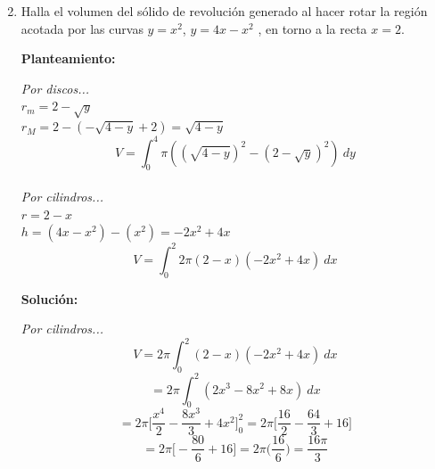 \documentclass[10pt,letterpaper]{article}
\begin{document}
\begin{enumerate}
\begin{multicols}{2}
\end{multicols}


\item Halla el volumen del sólido de revolución generado al hacer rotar la región acotada por las
      curvas $y = x^2$, $y = 4x - x^2$ , en torno a la recta $x = 2$.

\begin{multicols}{2}


\textbf{Planteamiento:}

\textit{Por discos...} \\
$r_m = 2-\sqrt{y}$ \\
$r_M = 2-(-\sqrt{4-y} + 2) = \sqrt{4-y}$
$$V = \int_{0}^{4} \pi ( (\sqrt{4-y})^2 - (2-\sqrt{y})^2 ) \ dy$$ \\

\textit{Por cilindros...} \\
$r = 2-x$ \\
$h = (4x-x^2)-(x^2) = -2x^2 + 4x$
$$V = \int_{0}^{2} 2\pi (2-x)(-2x^2+4x)\ dx$$

\textbf{Solución:}

\textit{Por cilindros...}
$$V = 2\pi \int_{0}^{2} (2-x)(-2x^2+4x)\ dx$$
$$= 2\pi \int_{0}^{2} (2x^3 - 8x^2 + 8x)\ dx$$
$$= 2\pi \bigg[ \frac{x^4}{2} - \frac{8x^3}{3} + 4x^2 \bigg]_{0}^{2}
= 2\pi \bigg[ \frac{16}{2} - \frac{64}{3} + 16 \bigg]$$
$$= 2\pi \bigg[ -\frac{80}{6} + 16 \bigg] = 2\pi \Big( \frac{16}{6} \Big)
= \frac{16\pi}{3}$$


\end{multicols}
\end{enumerate}
\end{document}
